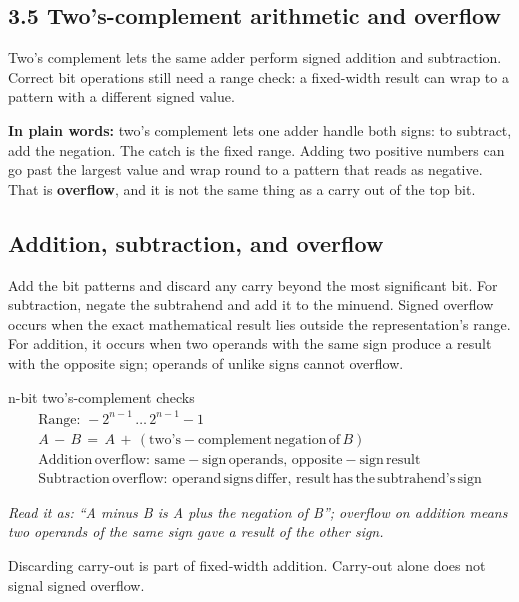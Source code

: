 \documentclass[11pt]{article}
\begin{document}
\begin{keepsection}
\section{3.5 Two’s-complement arithmetic and overflow}

Two’s complement lets the same adder perform signed addition and subtraction. Correct bit operations still need a range check: a fixed-width result can wrap to a pattern with a different signed value.

\begin{plainbox}\textbf{In plain words:} two’s complement lets one adder handle both signs: to subtract, add the negation. The catch is the fixed range. Adding two positive numbers can go past the largest value and wrap round to a pattern that reads as negative. That is \textbf{overflow}, and it is not the same thing as a carry out of the top bit.\end{plainbox}

\begin{keepsection}
\subsection{Addition, subtraction, and overflow}

Add the bit patterns and discard any carry beyond the most significant bit. For subtraction, negate the subtrahend and add it to the minuend. Signed overflow occurs when the exact mathematical result lies outside the representation’s range. For addition, it occurs when two operands with the same sign produce a result with the opposite sign; operands of unlike signs cannot overflow.

\begin{equationcard}{n-bit two’s-complement checks}
\[ \begin{gathered} \text{Range}:\, -2^{{n}-1}\, …\, 2^{{n}-1}-1 \\ {A}\, -\, {B}\, =\, {A}\, +\, (\text{two}’\mathrm{s}-\text{complement}\, \text{negation}\, \text{of}\, {B}) \\ \text{Addition}\, \text{overflow}:\, \text{same}-\text{sign}\, \text{operands},\, \text{opposite}-\text{sign}\, \text{result} \\ \text{Subtraction}\, \text{overflow}:\, \text{operand}\, \text{signs}\, \text{differ},\, \text{result}\, \text{has}\, \text{the}\, \text{subtrahend}’\mathrm{s}\, \text{sign} \end{gathered} \]
{\small \emph{Read it as: “A minus B is A plus the negation of B”; overflow on addition means two operands of the same sign gave a result of the other sign.}\par Discarding carry-out is part of fixed-width addition. Carry-out alone does not signal signed overflow.}
\end{equationcard}


\end{keepsection}
\end{keepsection}
\end{document}
